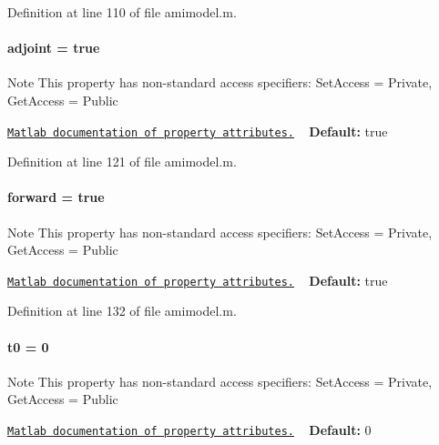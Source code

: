 Definition at line 110 of file amimodel.\+m.

\hypertarget{classamimodel_ab6d500b41cf50693452415caca31d32e}{}
\paragraph[{adjoint}]{\setlength{\rightskip}{0pt plus 5cm}adjoint = true}\label{classamimodel_ab6d500b41cf50693452415caca31d32e}
\begin{DoxyNote}{Note}
This property has non-\/standard access specifiers\+: {\ttfamily Set\+Access = Private, Get\+Access = Public} 

\href{http://www.mathworks.com/help/matlab/matlab_oop/property-attributes.html}{\tt Matlab documentation of property attributes.} ~\newline
{\bfseries Default\+:} true 
\end{DoxyNote}


Definition at line 121 of file amimodel.\+m.

\hypertarget{classamimodel_a81e42e48c9c72814166c8f7cd414ce24}{}
\paragraph[{forward}]{\setlength{\rightskip}{0pt plus 5cm}forward = true}\label{classamimodel_a81e42e48c9c72814166c8f7cd414ce24}
\begin{DoxyNote}{Note}
This property has non-\/standard access specifiers\+: {\ttfamily Set\+Access = Private, Get\+Access = Public} 

\href{http://www.mathworks.com/help/matlab/matlab_oop/property-attributes.html}{\tt Matlab documentation of property attributes.} ~\newline
{\bfseries Default\+:} true 
\end{DoxyNote}


Definition at line 132 of file amimodel.\+m.

\hypertarget{classamimodel_abdb5a42ffee3ca622484b53a322f1004}{}
\paragraph[{t0}]{\setlength{\rightskip}{0pt plus 5cm}t0 = 0}\label{classamimodel_abdb5a42ffee3ca622484b53a322f1004}
\begin{DoxyNote}{Note}
This property has non-\/standard access specifiers\+: {\ttfamily Set\+Access = Private, Get\+Access = Public} 

\href{http://www.mathworks.com/help/matlab/matlab_oop/property-attributes.html}{\tt Matlab documentation of property attributes.} ~\newline
{\bfseries Default\+:} 0 
\end{DoxyNote}


